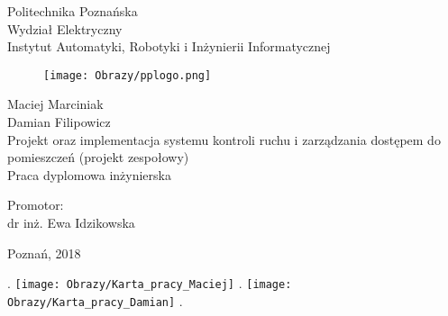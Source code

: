\documentclass[twoside,10pt]{article}
\title{\TytulPolski}
\author{\StudentA}
\def\TytulPolski    {Projekt oraz implementacja systemu kontroli ruchu i zarządzania dostępem do pomieszczeń (projekt zespołowy)}
\def\Promotor    {dr inż. Ewa Idzikowska}
\def\StudentA     {Maciej Marciniak}
\def\StudentB     {Damian Filipowicz}
\begin{document}
\thispagestyle{empty}
\setcounter{page}{0}
\begin{center}
\vspace{-10mm}
Politechnika Poznańska\\
Wydział Elektryczny\\  
Instytut Automatyki, Robotyki i Inżynierii Informatycznej\\
\vspace{8mm}
\begin{figure}[ht!]
\centering
\texttt{[image: Obrazy/pplogo.png]}
\end{figure}
\vspace{8mm}
\Large{\StudentA}\\
\Large{\StudentB}\\
\vspace{10mm}
\LARGE{\TytulPolski}\\
\vspace{10mm}
\Large{Praca dyplomowa inżynierska}\\
\end{center}
\vspace{40mm}
\begin{flushright}
{\large Promotor:\\
\Promotor}
\end{flushright}

\vspace{15mm}
\begin{center}
Poznań, 2018
\end{center}


\newpage
{\tiny .}
\thispagestyle{empty}
\setcounter{page}{0}
\newpage
\thispagestyle{empty}
\texttt{[image: Obrazy/Karta\_pracy\_Maciej]}
\newpage
{\tiny .}
\newpage
\thispagestyle{empty}
\setcounter{page}{2}
\texttt{[image: Obrazy/Karta\_pracy\_Damian]}
\newpage
\thispagestyle{empty}
{\tiny .}
\end{document}
